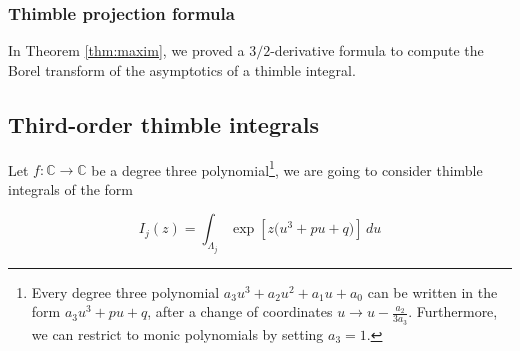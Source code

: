 \documentclass{article}
\theoremstyle{definition}
\newcommand{\C}{\mathbb{C}}
\begin{document}
\subsubsection{Thimble projection formula}
In Theorem \ref{thm:maxim}, we proved a $3/2$-derivative formula to compute the Borel transform of the asymptotics of a thimble integral. 
\subsection{Third-order thimble integrals}
Let $f\colon\C\to \C$ be a degree three polynomial\footnote{Every degree three polynomial $a_3 u^3+a_2 u^2+a_1 u+a_0$ can be written in the form $a_3u^3+pu+q$, after a change of coordinates $u\to u-\frac{a_2}{3 a_3}$. Furthermore, we can restrict to monic polynomials by setting $a_3=1$.}, we are going to consider thimble integrals of the form 

\[ I_j(z) = \int_{\Lambda_j} \exp\left[z\big(u^3 + pu + q)\right]\,du \]
\end{document}
